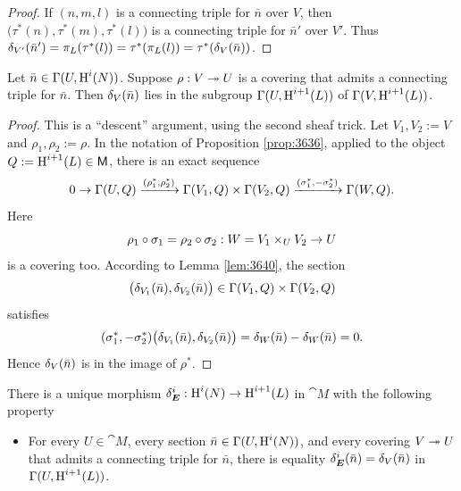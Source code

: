 \begin{proof}
If $(n, m, l)$ is a connecting triple for $\bar{n}$ over $V$, then 
$\bigl( \tau^*(n), \tau^*(m), \tau^*(l) \bigr)$
is a connecting triple for $\bar{n}'$ over $V'$. Thus
$\delta_{V'}(\bar{n}') = \pi_L(\tau^*(l)) = \tau^*(\pi_L(l)) = 
\tau^*(\delta_V(\bar{n}))$.
\end{proof}

\begin{lem} \label{lem:3653}
Let $\bar{n} \in \Gamma(U, \operatorname{H}^i(N))$. Suppose $\rho : V \twoheadrightarrow U$
is a covering that admits a connecting triple for $\bar{n}$.
Then $\delta_V(\bar{n})$ lies in the subgroup 
$\Gamma(U, \operatorname{H}^{i + 1}(L))$ of $\Gamma(V, \operatorname{H}^{i + 1}(L))$.
\end{lem}

\begin{proof}
This is a ``descent'' argument, using the second sheaf trick.
Let $V_1, V_2 := V$ and  $\rho_1, \rho_2 := \rho$.
In the notation of Proposition \ref{prop:3636}, applied to the object 
$Q := \operatorname{H}^{i + 1}(L) \in \operatorname{\mathsf{M}}$, there is an exact sequence 
\[ 0 \to \Gamma(U, Q) \xrightarrow{(\rho_1^*, \rho_2^*)} \Gamma(V_1, Q) \times \Gamma(V_2, Q)
\xrightarrow{(\sigma_1^*, - \sigma_2^*)} \Gamma(W, Q) .  \]
Here 
\[ \rho_1 \circ \sigma_1 = \rho_2 \circ \sigma_2 : 
W = V_1 \times_{U} V_2 \to U \]
is a covering too. 
According to Lemma \ref{lem:3640}, the section 
\[ \bigl( \delta_{V_1}(\bar{n}), \delta_{V_2}(\bar{n}) \bigr) \in 
\Gamma(V_1, Q) \times \Gamma(V_2, Q) \]
satisfies 
\[ (\sigma_1^*, - \sigma_2^*)\bigl( \delta_{V_1}(\bar{n}), \delta_{V_2}(\bar{n}) \bigr) =
\delta_W(\bar{n}) - \delta_W(\bar{n}) = 0 . \]
Hence $\delta_V(\bar{n})$ is in the image of $\rho^*$. 
\end{proof}

\begin{lem} \label{lem:3641}
There is a unique morphism 
$\delta_{\boldsymbol{E}}^i : \operatorname{H}^{i}(N) \to \operatorname{H}^{i + 1}(L)$
in $\cat{M}$ with the following property\tup{:}
\begin{itemize}
\item[($\dag$)] For every $U \in \cat{M}$, every section 
$\bar{n} \in \Gamma(U, \operatorname{H}^i(N))$, and every
covering $V \twoheadrightarrow U$ that admits a connecting triple for $\bar{n}$, there is 
equality 
$\delta_{\boldsymbol{E}}^i(\bar{n}) = \delta_V(\bar{n})$
in $\Gamma(U, \operatorname{H}^{i + 1}(L))$.
\end{itemize}
\end{lem}

